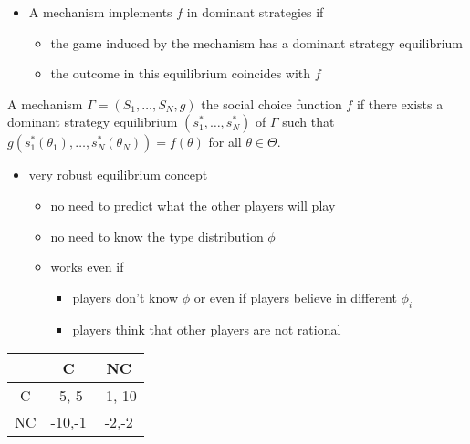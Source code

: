 \documentclass[english]{beamer}		%
\def\lyxframeend{} %
\begin{document}
\begin{itemize}
	\item A mechanism implements $f$ in dominant strategies if
	\begin{itemize}
		\item the game induced by the mechanism has a dominant strategy equilibrium
		\item the outcome in this equilibrium coincides with $f$
	\end{itemize}
\end{itemize}
\begin{definition}
	A mechanism $\Gamma=(S_{1},\dots,S_{N},g)$  the social choice function $f$  if there exists a dominant strategy equilibrium $(s_1^*,\dots,s_N^*)$ of $\Gamma$ such that $g(s_1^*(\theta_{1}),\dots,s_N^*(\theta_{N}))=f(\theta)$ for all $\theta\in\Theta$.
\end{definition}
\lyxframeend


\begin{itemize}
	\item very robust equilibrium concept
	\begin{itemize}
		\item no need to predict what the other players will play
		\item no need to know the type distribution $\phi$
		\item works even if
		\begin{itemize}
			\item players don't know $\phi$ or even if players believe in different $\phi_{i}$
			\item players think that other players are not rational
		\end{itemize}
	\end{itemize}
\end{itemize}
\lyxframeend


\begin{example}
	\begin{center}
		\begin{tabular}{c | c | c |}
			& C & NC\\ \hline
			C& -5,-5 &-1,-10\\ \hline
			NC&-10,-1&-2,-2\\ \hline
		\end{tabular}
	\end{center}
\end{example}
\lyxframeend
\end{document}

